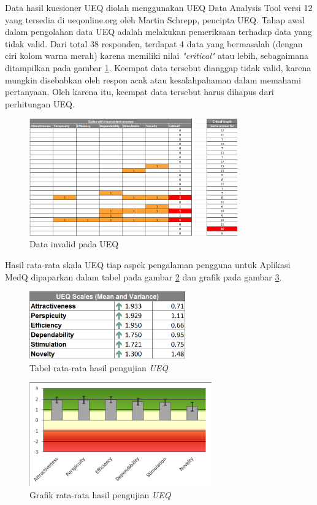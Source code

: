 Data hasil kuesioner UEQ diolah menggunakan UEQ Data Analysis Tool versi 12 yang tersedia di ueqonline.org oleh Martin Schrepp, pencipta UEQ. 
Tahap awal dalam pengolahan data UEQ adalah melakukan pemeriksaan terhadap data yang tidak valid. 
Dari total 38 responden, terdapat 4 data yang bermasalah (dengan ciri kolom warna merah) karena memiliki nilai \textit{"critical"} atau lebih, sebagaimana ditampilkan pada gambar \ref*{Fig:InvalidUEQ}. 
Keempat data tersebut dianggap tidak valid, karena mungkin disebabkan oleh respon acak atau kesalahpahaman dalam memahami pertanyaan. 
Oleh karena itu, keempat data tersebut harus dihapus dari perhitungan UEQ.
\begin{figure}[H]
	\centering
	\includegraphics[width=0.8\textwidth]{contents/chapter-4/images/invalidUEQ.png}
	\caption{Data invalid pada UEQ}
	\label{Fig:InvalidUEQ}
\end{figure}

Hasil rata-rata skala UEQ tiap aspek pengalaman pengguna untuk Aplikasi 
MedQ dipaparkan dalam tabel pada gambar \ref*{Fig : Tabel Skor UEQ} dan grafik pada gambar \ref*{Fig : Gambar Skor UEQ }.
\begin{figure}[H]
	\centering
	\includegraphics[width=0.6\textwidth]{contents/chapter-4/images/UEQScore.png}
	\caption{Tabel rata-rata hasil pengujian \textit{UEQ}}
	\label{Fig : Tabel Skor UEQ}
\end{figure}
\begin{figure}[H]
	\centering
	\includegraphics[width=0.7\textwidth]{contents/chapter-4/images/UEQScore-graph.png}
	\caption{Grafik rata-rata hasil pengujian \textit{UEQ}}
	\label{Fig : Gambar Skor UEQ }
\end{figure}

